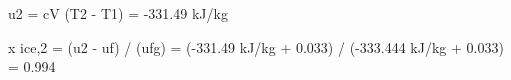 u2 = cV (T2 - T1) = -331.49 kJ/kg  

x ice,2 = (u2 - uf) / (ufg)  
= (-331.49 kJ/kg + 0.033) / (-333.444 kJ/kg + 0.033)  
= 0.994